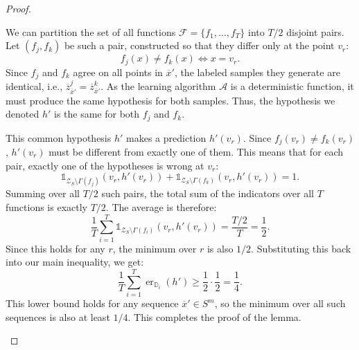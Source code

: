 \begin{proof}
\begin{subproof}
        We can partition the set of all functions $\mathcal{F}=\{f_1, \dots, f_T\}$ into $T/2$ disjoint pairs. Let $(f_j, f_k)$ be such a pair, constructed so that they differ only at the point $v_r$:
        \[
            f_j(x) \neq f_k(x) \iff x = v_r.
        \]
        Since $f_j$ and $f_k$ agree on all points in $\overline{x}'$, the labeled samples they generate are identical, i.e., $\overline{z}_{\overline{x}'}^{j} = \overline{z}_{\overline{x}'}^{k}$. As the learning algorithm $\mathcal{A}$ is a deterministic function, it must produce the same hypothesis for both samples. Thus, the hypothesis we denoted $h'$ is the same for both $f_j$ and $f_k$.

        This common hypothesis $h'$ makes a prediction $h'(v_r)$. Since $f_j(v_r) \neq f_k(v_r)$, $h'(v_r)$ must be different from exactly one of them. This means that for each pair, exactly one of the hypotheses is wrong at $v_r$:
        \[
            \mathds{1}_{\mathcal{Z}_S\setminus\Gamma(f_j)}(v_r, h'(v_r)) + \mathds{1}_{\mathcal{Z}_S\setminus\Gamma(f_k)}(v_r, h'(v_r)) = 1.
        \]
        Summing over all $T/2$ such pairs, the total sum of the indicators over all $T$ functions is exactly $T/2$. The average is therefore:
        \[
            \frac{1}{T}\sum_{i=1}^T \mathds{1}_{\mathcal{Z}_S\setminus\Gamma(f_i)}(v_r, h'(v_r)) = \frac{T/2}{T} = \frac{1}{2}.
        \]
        Since this holds for any $r$, the minimum over $r$ is also $1/2$. Substituting this back into our main inequality, we get:
        \[
            \frac{1}{T}\sum_{i=1}^T\operatorname{er}_{\mathbb{D}_i}(h') \geq \frac{1}{2} \cdot \frac{1}{2} = \frac{1}{4}.
        \]
        This lower bound holds for any sequence $\overline{x}' \in S^m$, so the minimum over all such sequences is also at least $1/4$. This completes the proof of the lemma.
    \end{subproof}
\end{proof}